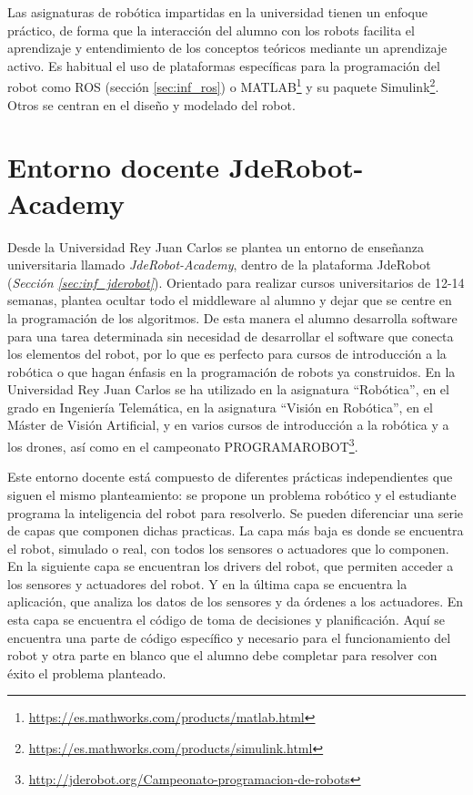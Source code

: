 Las asignaturas de robótica impartidas en la universidad tienen un enfoque práctico, de forma que la interacción del alumno con los robots facilita el aprendizaje y entendimiento de los conceptos teóricos mediante un aprendizaje activo. Es habitual el uso de plataformas específicas para la programación del robot como ROS (sección \ref{sec:inf_ros}) o MATLAB\footnote{\url{https://es.mathworks.com/products/matlab.html}} y su paquete Simulink\footnote{\url{https://es.mathworks.com/products/simulink.html}}. Otros se centran en el diseño y modelado del robot.

\section{Entorno docente JdeRobot-Academy }
\label{sec:intr_entornodocente}

Desde la Universidad Rey Juan Carlos se plantea un entorno de enseñanza universitaria llamado \textit{JdeRobot-Academy}, dentro de la plataforma JdeRobot (\textit{Sección \ref{sec:inf_jderobot}}). Orientado para realizar cursos universitarios de 12-14 semanas, plantea ocultar todo el middleware al alumno y dejar que se centre en la programación de los algoritmos. De esta manera el alumno desarrolla software para una tarea determinada sin necesidad de desarrollar el software que conecta los elementos del robot, por lo que es perfecto para cursos de introducción a la robótica o que hagan énfasis en la programación de robots ya construidos. En la Universidad Rey Juan Carlos se ha utilizado en la asignatura \textquotedblleft Robótica\textquotedblright, en el grado en Ingeniería Telemática, en la asignatura \textquotedblleft Visión en Robótica\textquotedblright, en el Máster de Visión Artificial, y en varios cursos de introducción a la robótica y a los drones, así como en el campeonato PROGRAMAROBOT\footnote{\url{http://jderobot.org/Campeonato-programacion-de-robots}}.

Este entorno docente está compuesto de diferentes prácticas independientes que siguen el mismo planteamiento: se propone un problema robótico y el estudiante programa la inteligencia del robot para resolverlo. Se pueden diferenciar una serie de capas que componen dichas practicas. La capa más baja es donde se encuentra el robot, simulado o real, con todos los sensores o actuadores que lo componen. En la siguiente capa se encuentran los drivers del robot, que permiten acceder a los sensores y actuadores del robot. Y en la última capa se encuentra la aplicación, que analiza los datos de los sensores y da órdenes a los actuadores. En esta capa se encuentra el código de toma de decisiones y planificación. Aquí se encuentra una parte de código específico y necesario para el funcionamiento del robot y otra parte en blanco que el alumno debe completar para resolver con éxito el problema planteado. 

